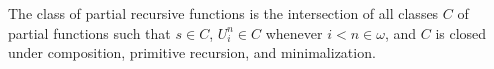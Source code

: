 The class of partial recursive functions is the intersection of all classes $C$ of partial functions such that $s \in C$, $U_i^n \in C$ whenever $i < n \in \omega$, and $C$ is closed under composition, primitive recursion, and minimalization.
